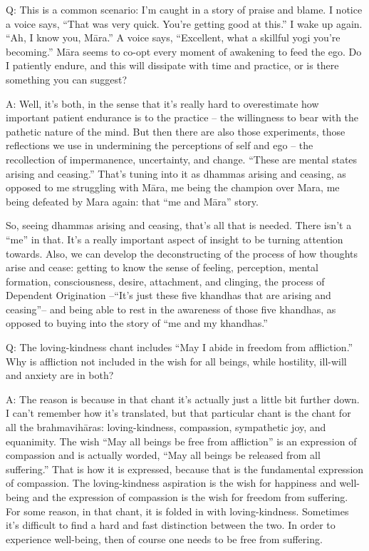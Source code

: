 \vspace{\the\qaskip}
Q: This is a common scenario: I’m caught in a story of praise and blame.
I notice a voice says, “That was very quick. You’re getting good at
this.” I wake up again. “Ah, I know you, Māra.” A voice says,
“Excellent, what a skillful yogi you’re becoming.” Māra seems to co-opt
every moment of awakening to feed the ego. Do I patiently endure, and
this will dissipate with time and practice, or is there something you
can suggest?

\vspace{\the\qaskip}
A: Well, it’s both, in the sense that it’s really hard to overestimate
how important patient endurance is to the practice – the willingness to
bear with the pathetic nature of the mind. But then there are also those
experiments, those reflections we use in undermining the perceptions of
self and ego – the recollection of impermanence, uncertainty, and
change. “These are mental states arising and ceasing.” That’s tuning
into it as dhammas arising and ceasing, as opposed to me struggling with
Māra, me being the champion over Mara, me being defeated by Mara again:
that “me and Māra” story.

So, seeing dhammas arising and ceasing, that’s all that is needed. There
isn’t a “me” in that. It’s a really important aspect of insight to be
turning attention towards. Also, we can develop the deconstructing of
the process of how thoughts arise and cease: getting to know the sense
of feeling, perception, mental formation, consciousness, desire,
attachment, and clinging, the process of Dependent Origination –“It’s
just these five khandhas that are arising and ceasing”– and being able
to rest in the awareness of those five khandhas, as opposed to buying
into the story of “me and my khandhas.”

\vspace{\the\qaskip}
Q: The loving-kindness chant includes “May I abide in freedom from
affliction.” Why is affliction not included in the wish for all beings,
while hostility, ill-will and anxiety are in both?

\vspace{\the\qaskip}
A: The reason is because in that chant it’s actually just a little bit
further down. I can’t remember how it’s translated, but that particular
chant is the chant for all the brahmavihāras: loving-kindness,
compassion, sympathetic joy, and equanimity. The wish “May all beings be
free from affliction” is an expression of compassion and is actually
worded, “May all beings be released from all suffering.” That is how it
is expressed, because that is the fundamental expression of compassion.
The loving-kindness aspiration is the wish for happiness and well-being
and the expression of compassion is the wish for freedom from suffering.
For some reason, in that chant, it is folded in with loving-kindness.
Sometimes it’s difficult to find a hard and fast distinction between the
two. In order to experience well-being, then of course one needs to be
free from suffering.

